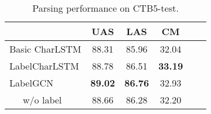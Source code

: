 \begin{table}[tb]
\setlength{\tabcolsep}{6.5pt}
\centering
\begin{tabular}{lccccc}
    \toprule
    &  UAS & LAS & CM \\
    \hline
    Basic CharLSTM &88.31 &85.96 &32.04 \\
    LabelCharLSTM    &88.78 &86.51 &\textbf{33.19} \\
    \hline
    LabelGCN       &\textbf{89.02}  &\textbf{86.76} & 32.93 \\
    $~~~~~$ w/o label  &88.66 &86.28 &32.20\\
    \bottomrule
\end{tabular}
    \caption{Parsing performance on CTB5-test.}
    \label{table:results-dependency}
\end{table}

%



